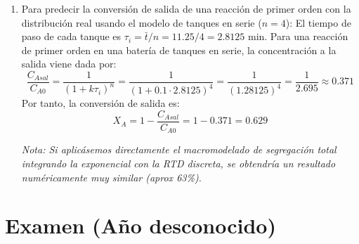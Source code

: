 \begin{enumerate}[label=\alph*)]
	\item Para predecir la conversión de salida de una reacción de primer orden con la distribución real usando el modelo de tanques en serie ($n=4$):
	      El tiempo de paso de cada tanque es $\tau_i = \bar{t} / n = 11.25 / 4 = 2.8125$ min.
	      Para una reacción de primer orden en una batería de tanques en serie, la concentración a la salida viene dada por:
	      \begin{equation*}
		      \frac{C_{Asal}}{C_{A0}} = \frac{1}{(1 + k \tau_i)^n} = \frac{1}{(1 + 0.1 \cdot 2.8125)^4} = \frac{1}{(1.28125)^4} = \frac{1}{2.695} \approx 0.371
	      \end{equation*}
	      Por tanto, la conversión de salida es:
	      \begin{equation*}
		      X_A = 1 - \frac{C_{Asal}}{C_{A0}} = 1 - 0.371 = 0.629
	      \end{equation*}

	      \textit{Nota: Si aplicásemos directamente el macromodelado de segregación total integrando la exponencial con la RTD discreta, se obtendría un resultado numéricamente muy similar (aprox 63\%).}
\end{enumerate}

\newpage
\section{Examen (Año desconocido)}

